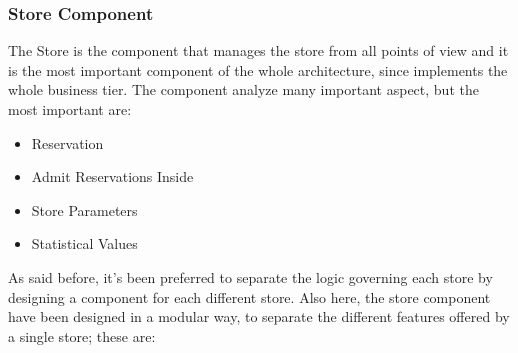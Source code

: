 \documentclass{article}
\begin{document}
		\subsubsection{Store Component}
			The Store is the component that manages the store from all points of view and it is the most important component of the whole architecture, since implements the whole business tier. The component analyze many important aspect, but the most important are:
			
			\begin{itemize}
				\item Reservation
				\item Admit Reservations Inside
				\item Store Parameters
				\item Statistical Values
			\end{itemize}
		
			As said before, it’s been preferred to separate the logic governing each store by designing a component for each different store. Also here, the store component have been designed in a modular way, to separate the different features offered by a single store; these are:
			
\end{document}
